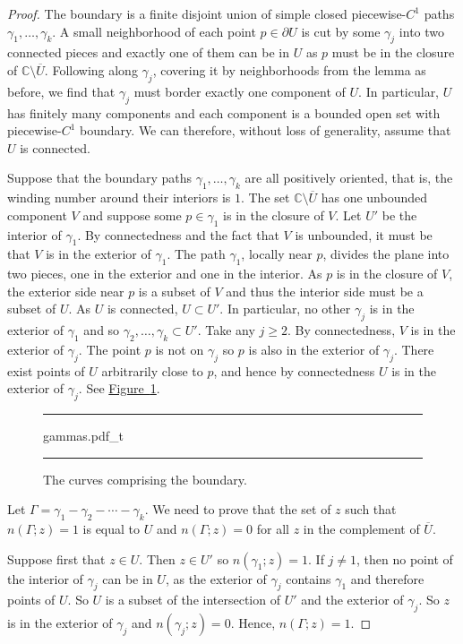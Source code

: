 \documentclass[12pt,openany]{book}
\newcommand{\widebar}[1]{\overline{#1}}
\newcommand{\C}{{\mathbb{C}}}
\theoremstyle{plain}
\theoremstyle{remark}
\theoremstyle{definition}
\newenvironment{myfig}{%
\begin{figure}[h!t]
\noindent\rule{\textwidth}{0.5pt}\vspace{12pt}\par\centering}%
{\par\noindent\rule{\textwidth}{0.5pt}
\end{figure}}
\theoremstyle{exercise}
\theoremstyle{example}
\newcommand{\figureref}[1]{\hyperref[#1]{Figure~\ref*{#1}}}
\begin{document}
\begin{proof}
The boundary is a finite disjoint union of simple closed
piecewise-$C^1$ paths $\gamma_1,\ldots,\gamma_k$.
A small neighborhood of each point $p \in \partial U$
is cut by some $\gamma_j$ into two connected pieces
and exactly one of them can be in $U$ as $p$
must be in the closure of $\C \setminus \widebar{U}$.
Following along $\gamma_j$, covering it by neighborhoods
from the lemma as before, we find that $\gamma_j$
must border exactly one component of $U$.
In particular, $U$ has finitely many components and
each component is a bounded open set with piecewise-$C^1$ boundary.
We can therefore, without loss of generality, assume that $U$
is connected.

Suppose that the boundary paths $\gamma_1,\ldots,\gamma_k$
are all positively
oriented, that is, the winding number around their interiors is $1$.
The set $\C \setminus \widebar{U}$
has one unbounded component $V$ and suppose some $p \in \gamma_1$ is in the
closure of $V$.
Let $U'$ be the interior of $\gamma_1$.
By connectedness and the fact that $V$ is unbounded,
it must be that $V$ is in the exterior of $\gamma_1$.
The path $\gamma_1$, locally near $p$, divides the plane into two pieces,
one in the exterior and one in the interior.
As $p$ is in the closure of $V$, the exterior side near $p$
is a subset of $V$ and thus the interior side must be a subset of $U$.
As $U$ is connected, $U \subset U'$.
In particular, no other $\gamma_j$ is in the exterior of $\gamma_1$ and so 
$\gamma_2,\ldots,\gamma_k \subset U'$.
Take any $j \geq 2$.
By connectedness, $V$ is in the exterior of $\gamma_j$.
The point $p$ is not on $\gamma_j$ so $p$ is also in the
exterior of $\gamma_j$.  There exist points of $U$ arbitrarily
close to $p$, and hence by connectedness $U$ is in the exterior of
$\gamma_j$.
See \figureref{fig:gammas}.
\begin{myfig}
{gammas.pdf_t}
\caption{The curves comprising the boundary.\label{fig:gammas}}
\end{myfig}

Let $\Gamma = \gamma_1 - \gamma_2 - \cdots - \gamma_k$.
We need to prove that the set of $z$ such that $n(\Gamma;z) = 1$ is equal to
$U$ and $n(\Gamma;z) = 0$ for all $z$ in the complement of $\widebar{U}$.

Suppose first that $z \in U$.  Then $z \in U'$ so $n(\gamma_1;z) = 1$.
If $j \neq 1$, then no point of the interior of $\gamma_j$ can be in $U$, as the
exterior of $\gamma_j$ contains $\gamma_1$ and therefore points of $U$.
So $U$ is a subset of the intersection of $U'$ and the exterior of
$\gamma_j$.
So $z$ is in the exterior of $\gamma_j$ and $n(\gamma_j;z) = 0$.  Hence,
$n(\Gamma;z) = 1$.


\end{proof}
\end{document}
